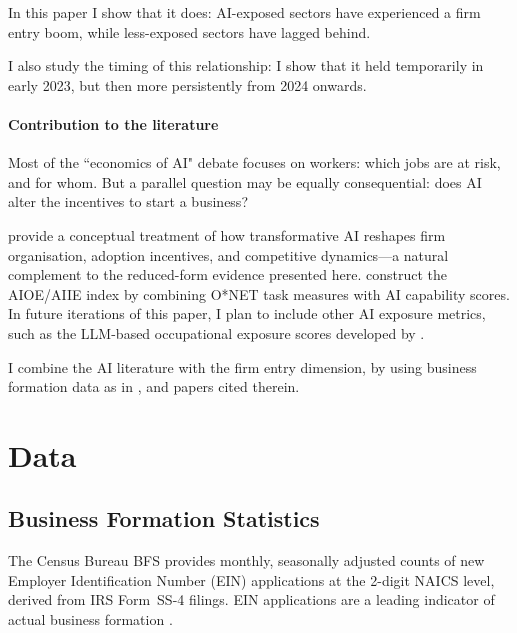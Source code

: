 \documentclass[12pt]{article}
\begin{document}
In this paper I show that it does: AI-exposed sectors have experienced a firm entry boom, while less-exposed sectors have lagged behind.

I also study the timing of this relationship: I show that it held temporarily in early 2023, but then more persistently from 2024 onwards. 



\paragraph{Contribution to the literature}

Most of the ``economics of AI" debate focuses on workers: which jobs are at risk, and
for whom.
But a parallel question may be equally consequential: does AI alter the
incentives to start a business?

\citet{chatterji2025transformative} provide a conceptual treatment of how
transformative AI reshapes firm organisation, adoption incentives, and
competitive dynamics---a natural complement to the reduced-form evidence
presented here.
\citet{felten2021occupational} construct the AIOE/AIIE index by combining
O*NET task measures with AI capability scores. In future iterations of this paper, I plan to include other AI exposure metrics, such as the LLM-based occupational exposure scores developed by \citet{eloundou2024gpts}.

I combine the AI literature with the firm entry dimension, by using business formation data as in \citet{decker2023surging}, and papers cited therein.



\section{Data}
\label{sec:data}

\subsection{Business Formation Statistics}
\label{sec:data_bfs}

The Census Bureau BFS provides monthly, seasonally adjusted counts of new
Employer Identification Number (EIN) applications at the 2-digit NAICS
level, derived from IRS Form~SS-4 filings.
EIN applications are a leading indicator of actual business formation \citep{decker2023surging}.
\end{document}
